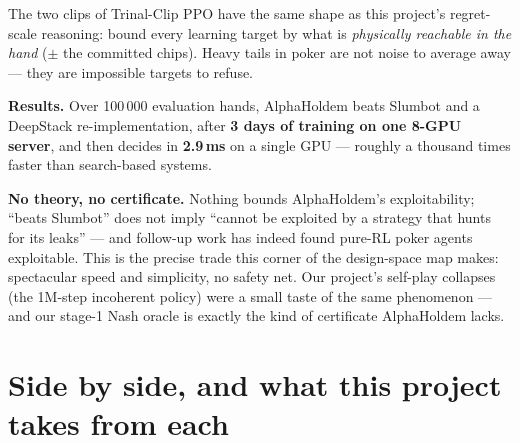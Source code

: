 \documentclass[11pt,a4paper]{article}
\begin{document}
\begin{intuition}
The two clips of Trinal-Clip PPO have the same shape as this project's
regret-scale reasoning: bound every learning target by what is
\emph{physically reachable in the hand} ($\pm$ the committed chips). Heavy
tails in poker are not noise to average away --- they are impossible targets
to refuse.
\end{intuition}

\textbf{Results.} Over 100\,000 evaluation hands, AlphaHoldem beats Slumbot
and a DeepStack re-implementation, after \textbf{3 days of training on one
8-GPU server}, and then decides in \textbf{2.9\,ms} on a single GPU ---
roughly a thousand times faster than search-based systems.

\begin{trap}
\textbf{No theory, no certificate.} Nothing bounds AlphaHoldem's
exploitability; ``beats Slumbot'' does not imply ``cannot be exploited by a
strategy that hunts for its leaks'' --- and follow-up work has indeed found
pure-RL poker agents exploitable. This is the precise trade this corner of the
design-space map makes: spectacular speed and simplicity, no safety net. Our
project's self-play collapses (the 1M-step incoherent policy) were a small
taste of the same phenomenon --- and our stage-1 Nash oracle is exactly the
kind of certificate AlphaHoldem lacks.
\end{trap}

\section{Side by side, and what this project takes from each}
\end{document}
